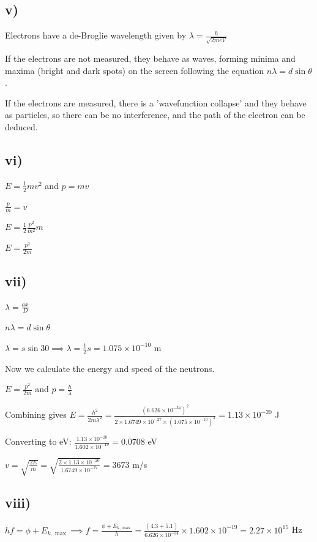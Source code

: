 \documentclass{article}
\begin{document}
\subsection*{v)}

Electrons have a de-Broglie wavelength given by $\lambda = \frac{h}{\sqrt{2meV}}$

If the electrons are not measured, they behave as waves, forming minima and maxima (bright and dark spots) on the screen following the equation $n\lambda=d\sin{\theta}$.

If the electrons are measured, there is a 'wavefunction collapse' and they behave as particles, so there can be no interference, and the path of the electron can be deduced.

\subsection*{vi)}

$E = \frac{1}{2}mv^2$ and $p = mv$

$\frac{p}{m}=v$

$E = \frac{1}{2}\frac{p^2}{m^2}m$

$E = \frac{p^2}{2m}$

\subsection*{vii)}
$\lambda = \frac{ax}{D}$

$n\lambda = d \sin{\theta}$

$\lambda = s \sin30 \implies \lambda = \frac{1}{2}s = 1.075 \times 10^{-10}$ m 

Now we calculate the energy and speed of the neutrons.

$E = \frac{p^2}{2m}$ and $p=\frac{h}{\lambda}$

Combining gives $E = \frac{h^2}{2m\lambda^2} = \frac{(6.626\times 10^{-34})^2}{2 \times 1.6749 \times 10^{-27} \times (1.075 \times 10^{-10})^2} = 1.13 \times 10^{-20}$ J

Converting to eV: $\frac{ 1.13 \times 10^{-20}}{1.602 \times 10^{-19}} = 0.0708$ eV

$v = \sqrt{\frac{2E}{m}} = \sqrt{\frac{2 \times 1.13 \times 10^{-20}}{1.6749 \times 10^{-27}}} = 3673$ m/s

\subsection*{viii)}

$hf = \phi + E_{k, \max} \implies f = \frac{\phi + E_{k, \max}}{h} = \frac{(4.3 + 5.1)}{6.626 \times 10^{-34}} \times 1.602 \times 10^{-19} = 2.27 \times 10^{15}$ Hz
\end{document}
